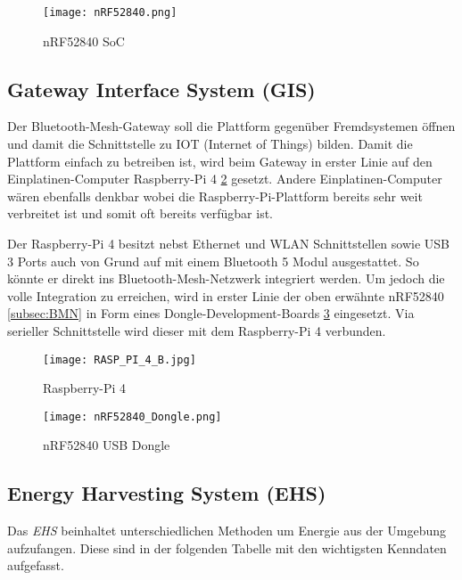\begin{figure}[h]
	\centering
	\texttt{[image: nRF52840.png]}
	\caption{nRF52840 SoC}
	\label{img:nRF52840}
\end{figure} 

\subsection{Gateway Interface System (GIS)}\label{subsec:Gateway}
Der Bluetooth-Mesh-Gateway soll die Plattform gegenüber Fremdsystemen öffnen und damit die Schnittstelle zu IOT (Internet of Things) bilden. Damit die Plattform einfach zu betreiben ist, wird beim Gateway in erster Linie auf den Einplatinen-Computer Raspberry-Pi 4 \ref{img:raspberryPi4} gesetzt. Andere Einplatinen-Computer wären ebenfalls denkbar wobei die Raspberry-Pi-Plattform bereits sehr weit verbreitet ist und somit oft bereits verfügbar ist.

Der Raspberry-Pi 4 besitzt nebst Ethernet und WLAN Schnittstellen sowie USB 3 Ports auch von Grund auf mit einem Bluetooth 5 Modul ausgestattet. So könnte er direkt ins Bluetooth-Mesh-Netzwerk integriert werden. Um jedoch die volle Integration zu erreichen, wird in erster Linie der oben erwähnte nRF52840 \ref{subsec:BMN} in Form eines Dongle-Development-Boards \ref{img:nRF52840USBDongle} eingesetzt. Via serieller Schnittstelle wird dieser mit dem Raspberry-Pi 4 verbunden.


\begin{figure}[h]
	\centering
	\texttt{[image: RASP\_PI\_4\_B.jpg]}
	\caption{Raspberry-Pi 4 \cite{reichelt_elektronik_gmbh_&_co_kg_rasp_nodate}}
	\label{img:raspberryPi4}
\end{figure} 

\begin{figure}[h]
	\centering
	\texttt{[image: nRF52840\_Dongle.png]}
	\caption{nRF52840 USB Dongle \cite{nordic_semiconductor_nrf52840-dongle-promo.png_nodate}}
	\label{img:nRF52840USBDongle}
\end{figure} 


\subsection{Energy Harvesting System (EHS)}\label{subsec:EHS}

Das \textit{EHS} beinhaltet unterschiedlichen Methoden um Energie aus der Umgebung aufzufangen. Diese sind in der folgenden Tabelle mit den wichtigsten Kenndaten aufgefasst. 

